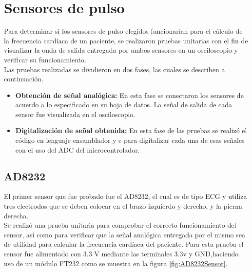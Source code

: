 
\section{Sensores de pulso}
Para determinar si los sensores de pulso elegidos funcionarían para el cálculo de la frecuencia cardíaca de un paciente, se realizaron pruebas unitarias con el fin de  visualizar la onda de salida entregada por ambos sensores en un osciloscopio y verificar su funcionamiento.\\

Las pruebas realizadas se dividieron en dos fases, las cuales se describen a continuación.

\begin{itemize}
	\item \textbf{Obtención de señal analógica:} En esta fase se conectaron los sensores de acuerdo a lo especificado en su hoja de datos. La señal de salida de cada sensor fue visualizada en el osciloscopio.
	\item \textbf{Digitalización de señal obtenida:} En esta fase de las pruebas se realizó el código en lenguaje ensamblador y c para digitalizar cada una de esas señales con el uso del ADC del microcontrolador.
\end{itemize}
\pagebreak

\subsection{AD8232}
El primer sensor que fue probado fue el AD8232, el cual es de tipo ECG y utiliza tres electrodos que se deben colocar en el brazo izquierdo y derecho, y la pierna derecha.\\

Se realizó una prueba unitaria para comprobar el correcto funcionamiento del sensor, así como para verificar que la señal analógica entregada por el mismo sea de utilidad para calcular la frecuencia cardíaca del paciente. Para esta prueba el sensor fue alimentado con 3.3 V mediante las terminales 3.3v y GND,haciendo uso de un módulo FT232 como se muestra en la figura \ref{fig:AD8232Sensor}.
	
